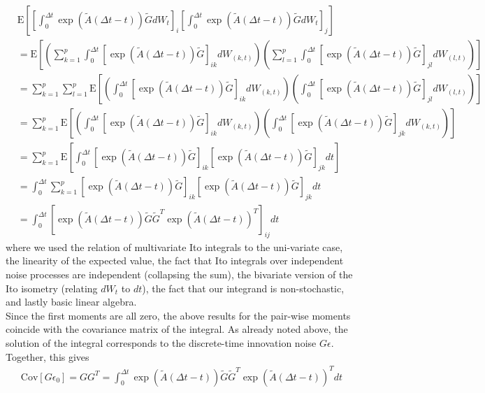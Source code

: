 \documentclass[10pt,letterpaper]{article}
\begin{document}
\begin{align}
& \mbox{E}\left[\left[\int_0^{\Delta{}t} \exp(\tilde{A}(\Delta{}t - t)) \tilde{G} dW_t\right]_i \left[\int_0^{\Delta{}t} \exp(\tilde{A}(\Delta{}t - t)) \tilde{G} dW_t\right]_j \right] \\
&= \mbox{E}\left[\left(\sum_{k=1}^p \int_0^{\Delta{}t} \left[\exp(\tilde{A}(\Delta{}t - t)) \tilde{G}\right]_{ik} dW_{(k,t)}\right) \left(\sum_{l=1}^p \int_0^{\Delta{}t} \left[\exp(\tilde{A}(\Delta{}t - t)) \tilde{G}\right]_{jl} dW_{(l,t)}\right) \right] \\
&= \sum_{k=1}^p \sum_{l=1}^p \mbox{E}\left[\left(\int_0^{\Delta{}t} \left[\exp(\tilde{A}(\Delta{}t - t)) \tilde{G}\right]_{ik} dW_{(k,t)}\right) \left(\int_0^{\Delta{}t} \left[\exp(\tilde{A}(\Delta{}t - t)) \tilde{G}\right]_{jl} dW_{(l,t)}\right) \right]  \\
&= \sum_{k=1}^p \mbox{E}\left[\left(\int_0^{\Delta{}t} \left[\exp(\tilde{A}(\Delta{}t - t)) \tilde{G}\right]_{ik} dW_{(k,t)}\right) \left(\int_0^{\Delta{}t} \left[\exp(\tilde{A}(\Delta{}t - t)) \tilde{G}\right]_{jk} dW_{(k,t)}\right) \right] \\
&= \sum_{k=1}^p \mbox{E}\left[\int_0^{\Delta{}t} \left[\exp(\tilde{A}(\Delta{}t - t)) \tilde{G}\right]_{ik} \left[\exp(\tilde{A}(\Delta{}t - t)) \tilde{G}\right]_{jk} dt \right] \\
&= \int_0^{\Delta{}t} \sum_{k=1}^p  \left[\exp(\tilde{A}(\Delta{}t - t)) \tilde{G}\right]_{ik} \left[\exp(\tilde{A}(\Delta{}t - t)) \tilde{G}\right]_{jk} dt  \\
&= \int_0^{\Delta{}t} \left[\exp(\tilde{A}(\Delta{}t - t)) \tilde{G}\tilde{G}^T  \exp(\tilde{A}(\Delta{}t - t))^T  \right]_{ij} dt
\end{align}
where we used the relation of multivariate Ito integrals to the uni-variate case, the linearity of the expected value, the fact that Ito integrals over independent noise processes are independent (collapsing the sum), the bivariate version of the Ito isometry (relating $dW_t$ to $dt$), the fact that our integrand is non-stochastic, and lastly basic linear algebra. \\
\noindent{}Since the first moments are all zero, the above results for the pair-wise moments coincide with the covariance matrix of the integral. As already noted above, the solution of the integral corresponds to the discrete-time innovation noise $G\epsilon$. Together, this gives
\begin{align}
\mbox{Cov}[G\epsilon_0] = G G^T = \int_0^{\Delta{}t} \exp(\tilde{A}(\Delta{}t - t)) \tilde{G}\tilde{G}^T  \exp(\tilde{A}(\Delta{}t - t))^T dt
\end{align}
\end{document}
